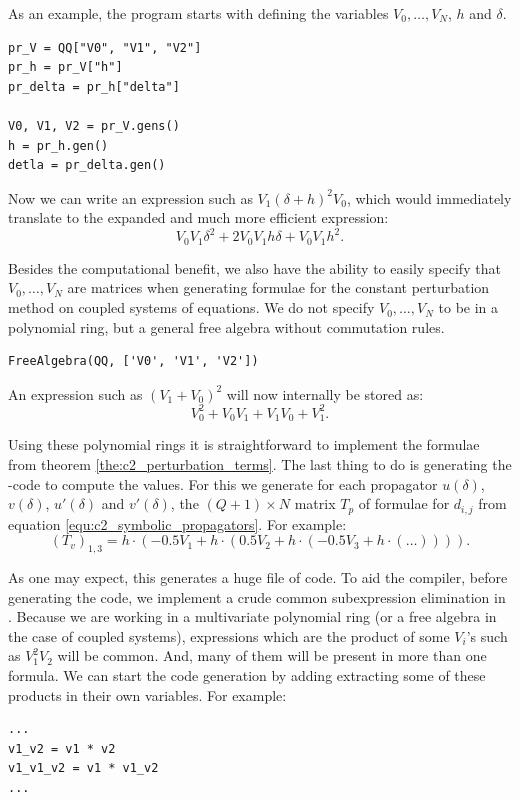 As an example, the \sage{} program starts with defining the variables $V_0, \dots, V_N$, $h$ and $\delta$.
\begin{verbatim}
pr_V = QQ["V0", "V1", "V2"]
pr_h = pr_V["h"]
pr_delta = pr_h["delta"]

V0, V1, V2 = pr_V.gens()
h = pr_h.gen()
detla = pr_delta.gen()
\end{verbatim}

Now we can write an expression such as $V_1 (\delta + h)^2 V_0$, which \sage{} would immediately translate to the expanded and  much more efficient expression:
$$
    V_{0} V_{1} \delta^{2} + 2 V_{0} V_{1} h \delta + V_{0} V_{1} h^{2}\text{.}
$$

Besides the computational benefit, we also have the ability to easily specify that $V_0, \dots, V_N$ are matrices when generating formulae for the constant perturbation method on coupled systems of equations. We do not specify $V_0, \dots, V_N$ to be in a polynomial ring, but a general free algebra without commutation rules.
\begin{verbatim}
FreeAlgebra(QQ, ['V0', 'V1', 'V2'])
\end{verbatim}
An expression such as $(V_1 + V_0)^2$ will now internally be stored as:
$$
    V_{0}^{2} + V_{0} V_{1} + V_{1} V_{0} + V_{1}^{2}\text{.}
$$

Using these polynomial rings it is straightforward to implement the formulae from theorem \ref{the:c2_perturbation_terms}. The last thing to do is generating the \cpp{}-code to compute the values. For this we generate for each propagator $u(\delta)$, $v(\delta)$, $u'(\delta)$ and $v'(\delta)$, the $(Q+1)\times N$ matrix $T_p$ of formulae for $d_{i,j}$ from equation \eqref{equ:c2_symbolic_propagators}. For example:
$$
    (T_v)_{1, 3} = h\cdot\left(-0.5 V_1 + h\cdot\left(0.5 V_2 + h\cdot\left(-0.5 V_3 + h\cdot\left(\dots\right)\right)\right)\right)\text{.}
$$

As one may expect, this generates a huge file of code. To aid the compiler, before generating the code, we implement a crude common subexpression elimination in \sage{}. Because we are working in a multivariate polynomial ring (or a free algebra in the case of coupled systems), expressions which are the product of some $V_i$'s such as  $V_1^2 V_2$ will be common. And, many of them will be present in more than one formula. We can start the code generation by adding extracting some of these products in their own variables. For example:
\begin{verbatim}
...
v1_v2 = v1 * v2
v1_v1_v2 = v1 * v1_v2
...
\end{verbatim}

